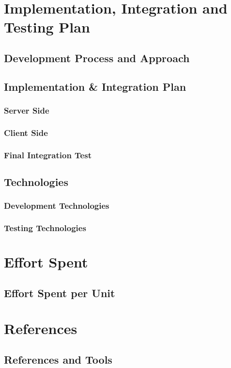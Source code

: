 \documentclass[a4paper,12pt]{article}
\begin{document}
\section{Implementation, Integration and Testing Plan}
\subsection{Development Process and Approach}
\subsection{Implementation \& Integration Plan}
\subsubsection{Server Side}
\subsubsection{Client Side}
\subsubsection{Final Integration Test}
\subsection{Technologies}
\subsubsection{Development Technologies}
\subsubsection{Testing Technologies}

\section{Effort Spent}
\subsection{Effort Spent per Unit}

\section{References}
\subsection{References and Tools}
\end{document}
